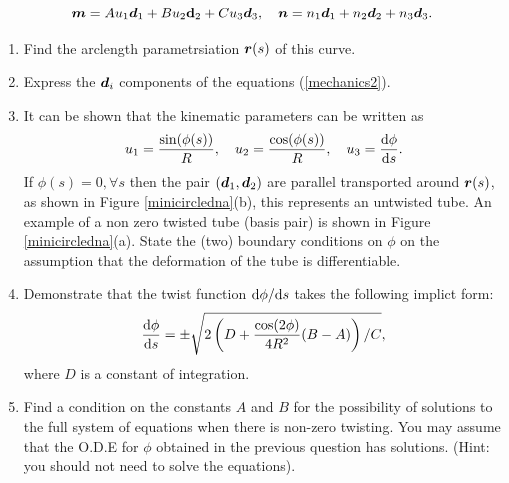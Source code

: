 \documentclass[a4paper,12pt]{article}
\begin{document}
\begin{equation}
\v{m} = A u_1\v{d}_1 + B u_2{\bf  d}_2 + C u_3\v{d}_3,\quad \v{n} = n_1\v{d}_1 + n_2\v{d}_2 +  n_3\v{d}_3.
\end{equation}
\begin{enumerate}[label=(\alph*)]
\item{Find the arclength parametrsiation $\v{r}(s)$ of this curve.
}
\item{Express the $\v{d}_i$ components of the equations (\ref{mechanics2}).
}
\item{
It can be shown that the kinematic parameters can be written as
\begin{equation}
u_1 = \frac{\sin(\phi(s))}{R},\quad u_2=\frac{\cos(\phi(s))}{R},\quad u_3 = \fd{\phi}{s}.
\end{equation}
If $\phi(s)=0,\forall s$ then the pair $(\v{d}_1,\v{d}_2)$ are parallel transported around  $\v{r}(s)$, as shown in Figure \ref{minicircledna}(b), this represents an untwisted tube. An example of a non zero twisted tube (basis pair) is shown in Figure \ref{minicircledna}(a). State the (two) boundary conditions on $\phi$ on the assumption that the deformation of the tube is differentiable.
}\item{
Demonstrate that the twist function $\fd{\phi}{s}$ takes the following implict form:
\begin{equation}
\fd{\phi}{s}=\pm \sqrt{2\left(D+\frac{\cos(2\phi)}{4R^2}(B-A)\right)/C},
\end{equation}
where $D$ is a constant of integration.
}\item{
Find a condition on the constants $A$ and $B$ for the possibility of solutions to the full system of equations when there is non-zero twisting. You may assume that the O.D.E for $\phi$ obtained in the previous question has solutions. (Hint: you should not need to solve the equations).
}
\end{enumerate}
\end{document}
